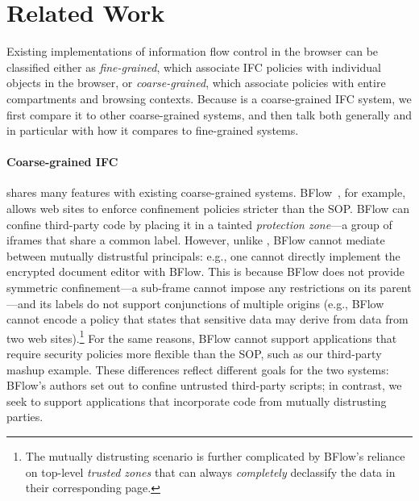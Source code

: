 \section{Related Work}
\label{sec:related}

Existing implementations of information flow control in the browser can
be classified either as \emph{fine-grained}, which associate IFC
policies with individual objects in the browser, or
\emph{coarse-grained}, which associate policies with
entire compartments and browsing contexts.  Because \sys{} is a
coarse-grained IFC system, we first compare it to other coarse-grained
systems, and then talk both generally and in particular with how
it compares to fine-grained systems.

\paragraph{Coarse-grained IFC} \sys{} shares many features
with existing coarse-grained systems.
%
BFlow~\cite{Yip:2009:PBS}, for example, allows web sites to enforce confinement policies
stricter than the SOP\@.
%
BFlow can confine third-party code by placing
it in a tainted \emph{protection zone}---a group
of iframes that share a common label.
%
However, unlike \sys{}, BFlow cannot mediate between mutually
distrustful principals: e.g., one cannot directly implement the
encrypted document editor with BFlow.
%
This is because BFlow does not provide symmetric confinement---a
sub-frame cannot impose any restrictions on its parent---and its
labels do not support conjunctions of multiple origins (e.g., BFlow
cannot encode a policy that states that sensitive data may derive from
data from two web sites).\footnote{ The mutually distrusting scenario
  is further complicated by BFlow's reliance on top-level
  \emph{trusted zones} that can always \emph{completely} declassify
  the data in their corresponding page.}
%
For the same reasons, BFlow cannot support applications that require
security policies more flexible than the SOP, such as our third-party
mashup example.
%
These differences reflect different goals for the two systems: BFlow's
authors set out to confine untrusted third-party scripts; in contrast,
we seek to support applications that incorporate code from mutually
distrusting parties.


